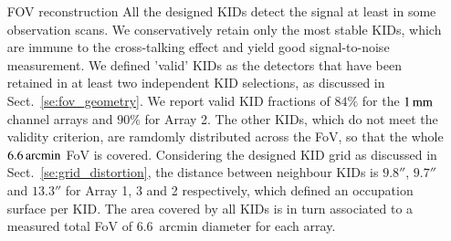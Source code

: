 \documentclass{aa}
\begin{document}
\begin{table}[!thbp]
{    
  }
\end{table}


\begin{enumerate}
\item[FOV reconstruction] All the designed KIDs detect the signal at least in some observation
  scans. We conservatively retain only the most stable KIDs, which are
  immune to the cross-talking effect and yield good signal-to-noise
  measurement. We defined 'valid' KIDs as the detectors that have been
  retained in at least two independent KID selections, as discussed in
  Sect.~\ref{se:fov_geometry}. We report valid KID fractions of $84\%$
  for the $1\,\rm{mm}$ channel arrays and $90\%$ for Array 2. The other
  KIDs, which do not meet the validity criterion, are ramdomly
  distributed across the FoV, so that the whole $6.6\,\rm{arcmin}$ FoV is
  covered. Considering the designed KID grid as discussed in
  Sect.~\ref{se:grid_distortion}, the distance between
  neighbour KIDs is $9.8''$, $9.7''$ and $13.3''$ for Array 1, 3 and 2
  respectively, which defined an occupation surface per KID. The area
  covered by all KIDs is in turn associated to a measured total FoV of
  $6.6$~arcmin diameter for each array.
  

\end{enumerate}
\end{document}
